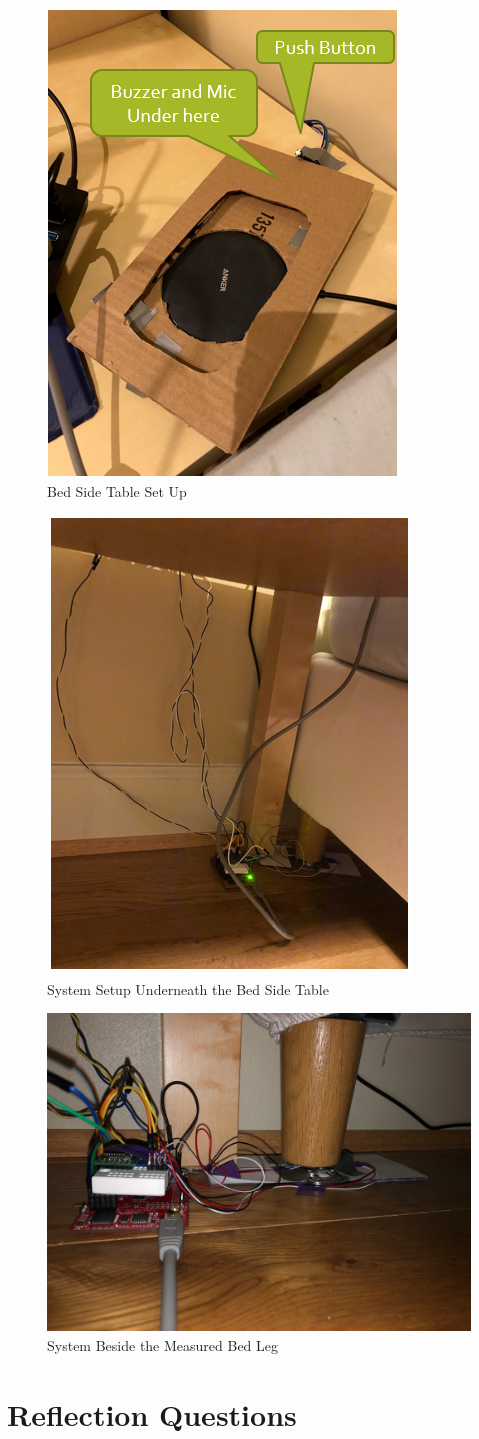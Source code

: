 \documentclass[11pt]{article}
\begin{document}
 \begin{figure}[H]
	\centering
	\includegraphics[width = 0.3\linewidth]{bedSide}
	\caption{Bed Side Table Set Up}
	\label{fig:bedtable}
\end{figure} 
 \begin{figure}[H]
	\centering
	\includegraphics[width = 0.4\linewidth]{underTable}
	\caption{System Setup Underneath the Bed Side Table}
	\label{fig:undertable}
\end{figure} 
 \begin{figure}[H]
	\centering
	\includegraphics[width = 0.6\linewidth]{closeup}
	\caption{System Beside the Measured Bed Leg}
	\label{fig:closeup}
\end{figure} 

\section{Reflection Questions}
\end{document}
